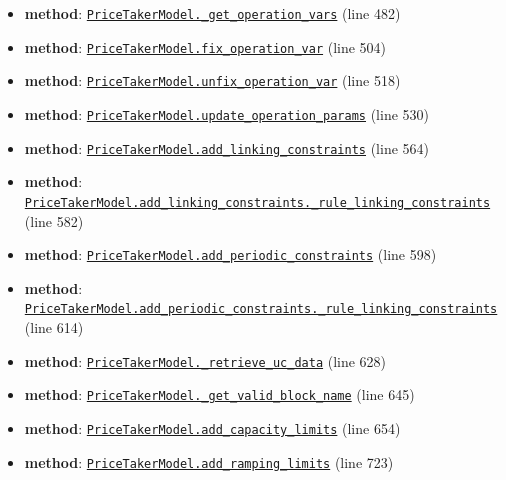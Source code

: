 \documentclass[11pt]{report}
\begin{document}
\begin{itemize}[leftmargin=*]
  \item \textbf{method}: \hyperref[def:pricetaker-price_taker_model.py:PriceTakerModel._get_operation_vars:L482]{\texttt{PriceTakerModel.\_get\_operation\_vars}} (line 482)
  \item \textbf{method}: \hyperref[def:pricetaker-price_taker_model.py:PriceTakerModel.fix_operation_var:L504]{\texttt{PriceTakerModel.fix\_operation\_var}} (line 504)
  \item \textbf{method}: \hyperref[def:pricetaker-price_taker_model.py:PriceTakerModel.unfix_operation_var:L518]{\texttt{PriceTakerModel.unfix\_operation\_var}} (line 518)
  \item \textbf{method}: \hyperref[def:pricetaker-price_taker_model.py:PriceTakerModel.update_operation_params:L530]{\texttt{PriceTakerModel.update\_operation\_params}} (line 530)
  \item \textbf{method}: \hyperref[def:pricetaker-price_taker_model.py:PriceTakerModel.add_linking_constraints:L564]{\texttt{PriceTakerModel.add\_linking\_constraints}} (line 564)
  \item \textbf{method}: \hyperref[def:pricetaker-price_taker_model.py:PriceTakerModel.add_linking_constraints._rule_linking_constraints:L582]{\texttt{PriceTakerModel.add\_linking\_constraints.\_rule\_linking\_constraints}} (line 582)
  \item \textbf{method}: \hyperref[def:pricetaker-price_taker_model.py:PriceTakerModel.add_periodic_constraints:L598]{\texttt{PriceTakerModel.add\_periodic\_constraints}} (line 598)
  \item \textbf{method}: \hyperref[def:pricetaker-price_taker_model.py:PriceTakerModel.add_periodic_constraints._rule_linking_constraints:L614]{\texttt{PriceTakerModel.add\_periodic\_constraints.\_rule\_linking\_constraints}} (line 614)
  \item \textbf{method}: \hyperref[def:pricetaker-price_taker_model.py:PriceTakerModel._retrieve_uc_data:L628]{\texttt{PriceTakerModel.\_retrieve\_uc\_data}} (line 628)
  \item \textbf{method}: \hyperref[def:pricetaker-price_taker_model.py:PriceTakerModel._get_valid_block_name:L645]{\texttt{PriceTakerModel.\_get\_valid\_block\_name}} (line 645)
  \item \textbf{method}: \hyperref[def:pricetaker-price_taker_model.py:PriceTakerModel.add_capacity_limits:L654]{\texttt{PriceTakerModel.add\_capacity\_limits}} (line 654)
  \item \textbf{method}: \hyperref[def:pricetaker-price_taker_model.py:PriceTakerModel.add_ramping_limits:L723]{\texttt{PriceTakerModel.add\_ramping\_limits}} (line 723)

\end{itemize}
\end{document}
